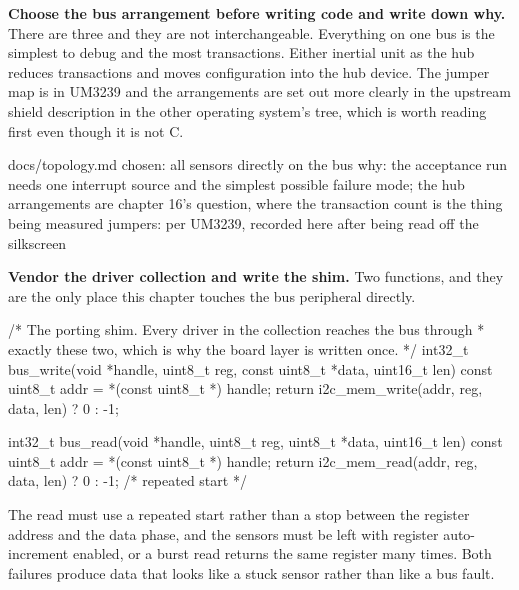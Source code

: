 \begin{steps}
\item \textbf{Choose the bus arrangement before writing code and write down
why.} There are three and they are not interchangeable. Everything on one bus is
the simplest to debug and the most transactions. Either inertial unit as the hub
reduces transactions and moves configuration into the hub device. The jumper map
is in UM3239 and the arrangements are set out more clearly in the upstream
shield description in the other operating system's tree, which is worth reading
first even though it is not C.
\begin{plaincode}
docs/topology.md
  chosen: all sensors directly on the bus
  why:    the acceptance run needs one interrupt source and the simplest
          possible failure mode; the hub arrangements are chapter 16's
          question, where the transaction count is the thing being measured
  jumpers: per UM3239, recorded here after being read off the silkscreen
\end{plaincode}

\item \textbf{Vendor the driver collection and write the shim.} Two functions,
and they are the only place this chapter touches the bus peripheral directly.
\begin{ccode}
/* The porting shim. Every driver in the collection reaches the bus through
 * exactly these two, which is why the board layer is written once.        */
int32_t bus_write(void *handle, uint8_t reg, const uint8_t *data, uint16_t len)
{
    const uint8_t addr = *(const uint8_t *) handle;
    return i2c_mem_write(addr, reg, data, len) ? 0 : -1;
}

int32_t bus_read(void *handle, uint8_t reg, uint8_t *data, uint16_t len)
{
    const uint8_t addr = *(const uint8_t *) handle;
    return i2c_mem_read(addr, reg, data, len) ? 0 : -1;   /* repeated start */
}
\end{ccode}
The read must use a repeated start rather than a stop between the register
address and the data phase, and the sensors must be left with register
auto-increment enabled, or a burst read returns the same register many times.
Both failures produce data that looks like a stuck sensor rather than like a bus
fault.


\end{steps}
